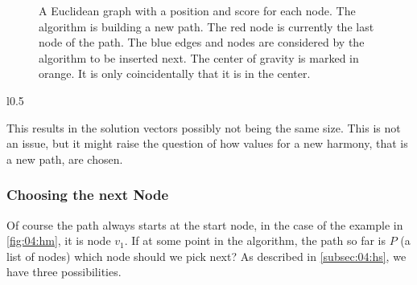 \begin{figure}
	\caption{A Euclidean graph with a position and score for each node. The algorithm is building a new path. The red node is currently the last node of the path. The blue edges and nodes are considered by the algorithm to be inserted next.
		The center of gravity is marked in orange. It is only coincidentally that it is in the center.}
	\label{fig:04:graphexample}
\end{figure}

\begin{wrapfigure}{l}{0.5\textwidth}
	\centering
	\caption{An example $HM$ with paths starting at node $v_1$ and ending at node $v_8$.}
	\label{fig:04:hm}
\end{wrapfigure}

This results in the solution vectors possibly not being the same size.
This is not an issue, but it might raise the question of how values for a new harmony, that is a new path, are chosen.

\subsubsection{Choosing the next Node}

Of course the path always starts at the start node, in the case of the example in \cref{fig:04:hm}, it is node $v_1$.
If at some point in the algorithm, the path so far is $P$ (a list of nodes) which node should we pick next?
As described in \cref{subsec:04:hs}, we have three possibilities.

